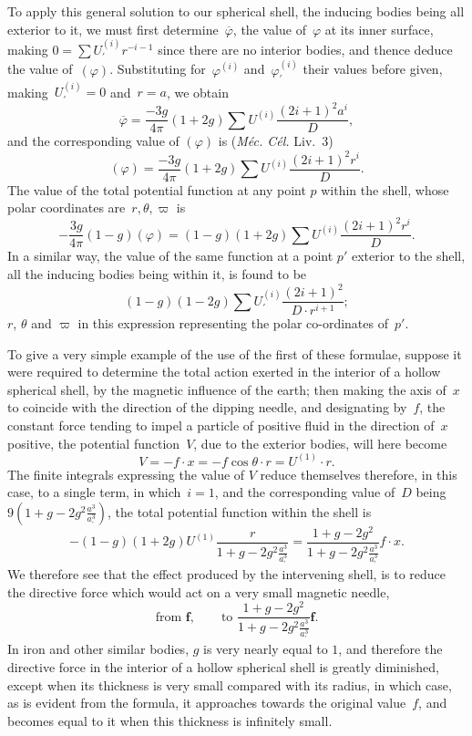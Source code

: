 \documentclass[12pt,notitlepage]{amsart}
\let\Title\textit
\renewcommand{\phi}{\varphi}
\begin{document}
To apply this general solution to our spherical shell, the inducing bodies
being all exterior to it, we must first determine~$\overline\phi$,
the value of~$\phi$ at its
inner surface, making $0=\sum U_\prime^{(i)}r^{-i-1}$
since there are no interior bodies, and
thence deduce the value of~$(\phi)$.
Substituting for~$\phi^{(i)}$ and~$\phi_\prime^{(i)}$ their values
before given, making~$U_\prime^{(i)}=0$ and~$r=a$, we obtain
\[
\overline\phi=
\frac{-3g}{4\pi}(1+2g)\sum U^{(i)}\frac{(2i+1)^2a^i}{D},
\]
and the corresponding value of $(\phi)$ is (\Title{M\'ec. C\'el.} Liv.~3)
\[
(\phi)=
\frac{-3g}{4\pi}(1+2g)\sum U^{(i)}\frac{(2i+1)^2r^i}{D}.
\]
The value of the total potential function at any point $p$ within the shell, whose
polar coordinates are~$r,\theta,\varpi$ is
\[
-\frac{3g}{4\pi}(1-g)(\phi)=(1-g)(1+2g)\sum U^{(i)}\frac{(2i+1)^2r^i}{D}.
\]
In a similar way, the value of the same function at a point $p'$ exterior to
the shell, all the inducing bodies being within it, is found to be
\[
(1-g)(1-2g)\sum U_\prime^{(i)}\frac{(2i+1)^2}{D\cdot r^{i+1}};
\]
$r$, $\theta$ and $\varpi$ in this expression
representing the polar co-ordinates of~$p'$.

To give a very simple example of the use of the first of these formulae,
suppose it were required to determine the total action exerted in the
interior of a hollow spherical shell, by the magnetic influence of the earth;
then making the axis of~$x$ to coincide
with the direction of the dipping needle,
and designating by~$f$,
the constant force tending to impel a particle of positive
fluid in the direction of~$x$ positive,
the potential function~$V$, due to the exterior
bodies, will here become
\[
V=-f\cdot x=-f\cos\theta\cdot r=U^{(1)}\cdot r.
\]
The finite integrals expressing the value of $V$ reduce themselves therefore,
in this case, to a single term, in which~$i=1$, and the corresponding value
of~$D$ being~$9(1+g-2g^2\frac{a^3}{a_\prime^3})$,
the total potential function within the shell is
\[
-(1-g)(1+2g)U^{(1)}\frac{r}{1+g-2g^2\frac{a^3}{a_\prime^3}}
=\frac{1+g-2g^2}{1+g-2g^2\frac{a^3}{a_\prime^3}}f\cdot x.
\]
We therefore see that the effect produced by the intervening shell, is to reduce
the directive force which would act on a very small magnetic needle,
\[
\text{from~}\mathbold{f},\qquad
\text{to~}\frac{1+g-2g^2}{1+g-2g^2\frac{a^3}{a_\prime^3}}
\mathbold{f}.
\]
In iron and other similar bodies, $g$ is very nearly equal to $1$,
and therefore the
directive force in the interior of a hollow spherical shell
is greatly diminished,
except when its thickness is very small compared with its radius, in which
case, as is evident from the formula,
it approaches towards the original value~$f$,
and becomes equal to it when this thickness is infinitely small.
\end{document}
